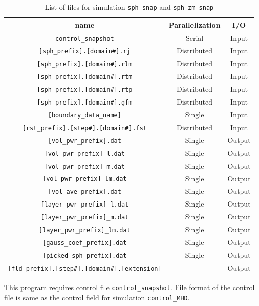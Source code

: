 \begin{table}[htdp]
\caption{List of files for simulation {\tt sph\_snap} and {\tt sph\_zm\_snap} }
\begin{center} 
\begin{tabular}{|c|c|c|}
\hline
 name & Parallelization & I/O \\ \hline \hline
\verb|control_snapshot| & Serial & Input \\ \hline
\verb|[sph_prefix].[domain#].rj|  & Distributed & Input \\
\verb|[sph_prefix].[domain#].rlm| & Distributed & Input \\
\verb|[sph_prefix].[domain#].rtm| & Distributed & Input \\
\verb|[sph_prefix].[domain#].rtp| & Distributed & Input \\ \hline
\verb|[sph_prefix].[domain#].gfm| & Distributed & Input \\ \hline
\verb|[boundary_data_name]| & Single & Input \\ \hline
\verb|[rst_prefix].[step#].[domain#].fst| &  Distributed & Input  \\ \hline
\verb|[vol_pwr_prefix].dat| & Single & Output \\ \hline
\verb|[vol_pwr_prefix]_l.dat| & Single & Output \\
\verb|[vol_pwr_prefix]_m.dat| & Single & Output \\
\verb|[vol_pwr_prefix]_lm.dat| & Single & Output \\
\verb|[vol_ave_prefix].dat| & Single & Output \\ \hline
\verb|[layer_pwr_prefix]_l.dat| & Single & Output \\
\verb|[layer_pwr_prefix]_m.dat| & Single & Output \\
\verb|[layer_pwr_prefix]_lm.dat| & Single & Output \\ \hline
\verb|[gauss_coef_prefix].dat| & Single & Output   \\
\verb|[picked_sph_prefix].dat| & Single & Output   \\ \hline
\verb|[fld_prefix].[step#].[domain#].[extension]| &  - & Output  \\ \hline
\end{tabular}
\end{center}
\label{table:sph_snap}
\end{table}
%
This program requires control file \verb|control_snapshot|. File format of the control file is same as the control field for simulation \hyperref[href_i:MHD_control]{\tt control\_MHD}.

